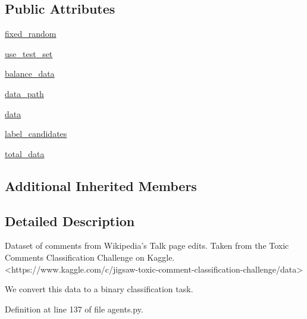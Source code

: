 \subsection*{Public Attributes}
\begin{DoxyCompactItemize}
\item 
\hyperlink{classparlai_1_1tasks_1_1dialogue__safety_1_1agents_1_1WikiToxicCommentsTeacher_a0a82908d2bd950c6bc497f6e095b06b7}{fixed\+\_\+random}
\item 
\hyperlink{classparlai_1_1tasks_1_1dialogue__safety_1_1agents_1_1WikiToxicCommentsTeacher_ad43ba64edd570e5fb5e4a4a0a68865cf}{use\+\_\+test\+\_\+set}
\item 
\hyperlink{classparlai_1_1tasks_1_1dialogue__safety_1_1agents_1_1WikiToxicCommentsTeacher_a9eeb881196ce42d8994dc4884fd9113a}{balance\+\_\+data}
\item 
\hyperlink{classparlai_1_1tasks_1_1dialogue__safety_1_1agents_1_1WikiToxicCommentsTeacher_a004f00e27fe4d6f437edab31e99018f5}{data\+\_\+path}
\item 
\hyperlink{classparlai_1_1tasks_1_1dialogue__safety_1_1agents_1_1WikiToxicCommentsTeacher_acfbf40cbf6be048c6667f4712e1db5c3}{data}
\item 
\hyperlink{classparlai_1_1tasks_1_1dialogue__safety_1_1agents_1_1WikiToxicCommentsTeacher_a81bfea7e10ad4273964a26599dcce45d}{label\+\_\+candidates}
\item 
\hyperlink{classparlai_1_1tasks_1_1dialogue__safety_1_1agents_1_1WikiToxicCommentsTeacher_a027ef2d3141fc6e055b17f3ce7a3c7c5}{total\+\_\+data}
\end{DoxyCompactItemize}
\subsection*{Additional Inherited Members}


\subsection{Detailed Description}
\begin{DoxyVerb}Dataset of comments from Wikipedia's Talk page edits. Taken from
the Toxic Comments Classification Challenge on Kaggle.
<https://www.kaggle.com/c/jigsaw-toxic-comment-classification-challenge/data>

We convert this data to a binary classification task.
\end{DoxyVerb}
 

Definition at line 137 of file agents.\+py.



